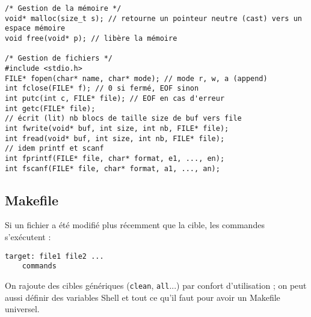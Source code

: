 \documentclass[a4paper]{article}
\begin{document}
\begin{lstlisting}
/* Gestion de la mémoire */
void* malloc(size_t s); // retourne un pointeur neutre (cast) vers un espace mémoire
void free(void* p); // libère la mémoire

/* Gestion de fichiers */
#include <stdio.h>
FILE* fopen(char* name, char* mode); // mode r, w, a (append)
int fclose(FILE* f); // 0 si fermé, EOF sinon
int putc(int c, FILE* file); // EOF en cas d'erreur
int getc(FILE* file);
// écrit (lit) nb blocs de taille size de buf vers file
int fwrite(void* buf, int size, int nb, FILE* file);
int fread(void* buf, int size, int nb, FILE* file);
// idem printf et scanf
int fprintf(FILE* file, char* format, e1, ..., en);
int fscanf(FILE* file, char* format, a1, ..., an);
\end{lstlisting}

\subsection{Makefile}

Si un fichier a été modifié plus récemment que la cible, les commandes s'exécutent :
\begin{verbatim}
target: file1 file2 ...
    commands
\end{verbatim}

On rajoute des cibles génériques (\verb?clean?, \verb?all?...) par confort d'utilisation ; on peut aussi définir des variables Shell et tout ce qu'il faut pour avoir un Makefile universel.
\end{document}
